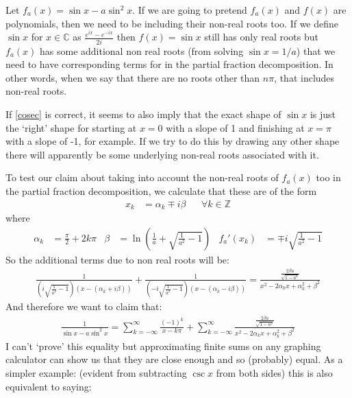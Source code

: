 \documentclass{article}
\begin{document}
Let $f_a(x) = \sin x - a\sin^2 x$. If we are going to pretend $f_a(x)$ and $f(x)$ are polynomials, then we need to be including their non-real roots too. If we define $\sin x$ for $x \in \mathbb{C}$ as $\frac{e^{ix}-e^{-ix}}{2i}$ then $f(x) = \sin x$ still has only real roots but $f_a(x)$ has some additional non real roots (from solving $\sin x = 1/a$) that we need to have corresponding terms for in the partial fraction decomposition. In other words, when we say that there are no roots other than $n \pi$, that includes non-real roots. 

\begin{tcolorbox}
If \eqref{cosec} is correct, it seems to also imply that the exact shape of $\sin x$ is just the `right' shape for starting at $x=0$ with a slope of 1 and finishing at $x=\pi$ with a slope of -1, for example. If we try to do this by drawing any other shape there will apparently be some underlying non-real roots associated with it.
\end{tcolorbox}
\newpage
To test our claim about taking into account the non-real roots of $f_a(x)$ too in the partial fraction decomposition, we calculate that these are of the form
\begin{align}
    x_k &= \alpha_k \mp i \beta && \forall k \in \mathbb{Z} 
\end{align}
where
\begin{align}
    \alpha_k &= \frac{\pi}{2} + 2k\pi &
    \beta &= \ln \left(\frac{1}{a} + \sqrt{\frac{1}{a^2} - 1}\right) & f_a'(x_k) &= \mp i \sqrt{\frac{1}{a^2} - 1}
\end{align}
So the additional terms due to non real roots will be:
\begin{align}
    \frac{1}{\left(i\sqrt{\frac{1}{a^2}-1}\right) \left(x - (\alpha_k + i \beta)\right)} + \frac{1}{\left(-i\sqrt{\frac{1}{a^2}-1}\right) \left(x - (\alpha_k - i \beta)\right)} = \frac{\frac{2\beta a}{\sqrt{1-a^2}}}{x^2 - 2\alpha_k x + \alpha_k^2 + \beta^2}
\end{align}
And therefore we want to claim that:
\begin{align}
    \frac{1}{\sin x - a \sin^2 x} = \sum_{k = -\infty}^{\infty} \frac{(-1)^k}{x-k\pi} + \sum_{k = -\infty}^{\infty} \frac{\frac{2\beta a}{\sqrt{1-a^2}}}{x^2 - 2\alpha_k x + \alpha_k^2 + \beta^2}
\end{align}
I can't `prove' this equality but approximating finite sums on any graphing calculator can show us that they are close enough and so (probably) equal. As a simpler example: (evident from subtracting $\csc x$ from both sides) this is also equivalent to saying:
\end{document}
